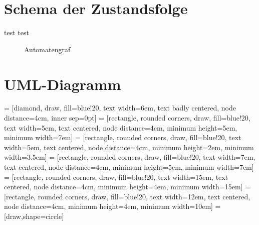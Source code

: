 \section{Schema der Zustandsfolge}
test test

 \begin{figure}[t!]
 \centering
{}
\caption{Automatengraf}
\label{pic:Automatengraf}
\end{figure}


\section{UML-Diagramm}

 = [diamond,                    draw, fill=blue!20, text width=6em, text badly centered, node distance=4cm, inner sep=0pt]
 =    [rectangle, rounded corners, draw, fill=blue!20, text width=5em, text centered,       node distance=4cm, minimum height=5em, minimum width=7em]
 =    [rectangle, rounded corners, draw, fill=blue!20, text width=5em, text centered,       node distance=4cm, minimum height=2em, minimum width=3.5em]
 =    [rectangle, rounded corners, draw, fill=blue!20, text width=7em, text centered,       node distance=4cm, minimum height=5em, minimum width=7em]
 =    [rectangle, rounded corners, draw, fill=blue!20, text width=15em, text centered,       node distance=4cm, minimum height=4em, minimum width=15em]
 =    [rectangle, rounded corners, draw, fill=blue!20, text width=12em, text centered,       node distance=4cm, minimum height=4em, minimum width=10em]
=[draw,shape=circle]

